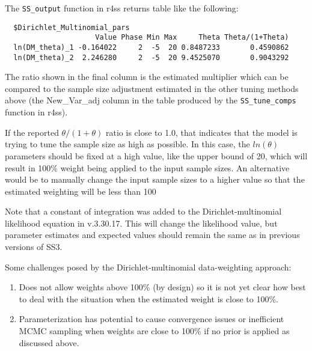 The \texttt{SS\_output} function in r4ss returns table like the following:
\begin{small}
\begin{verbatim}
  $Dirichlet_Multinomial_pars
                     Value Phase Min Max     Theta Theta/(1+Theta)
  ln(DM_theta)_1 -0.164022     2  -5  20 0.8487233       0.4590862
  ln(DM_theta)_2  2.246280     2  -5  20 9.4525070       0.9043292
\end{verbatim}
\end{small}


The ratio shown in the final column is the estimated multiplier which can be compared to the sample size adjustment estimated in the other tuning methods above (the New\_Var\_adj column in the table produced by the \texttt{SS\_tune\_comps} function in r4ss).

If the reported $\theta/(1+\theta)$ ratio is close to 1.0, that indicates that the model is trying to tune the sample size as high as possible. In this case, the $ln(\theta)$ parameters should be fixed at a high value, like the upper bound of 20, which will result in 100\% weight being applied to the input sample sizes. An alternative would be to manually change the input sample sizes to a higher value so that the estimated weighting will be less than 100%

Note that a constant of integration was added to the Dirichlet-multinomial likelihood equation in v.3.30.17. This will change the likelihood value, but parameter estimates and expected values should remain the same as in previous versions of SS3.

Some challenges posed by the Dirichlet-multinomial data-weighting approach:
\begin{enumerate}
	\item Does not allow weights above 100\% (by design) so it is not yet clear how best to deal with the situation when the estimated weight is close to 100\%.
	\item Parameterization has potential to cause convergence issues or inefficient MCMC sampling when weights are close to 100\% if no prior is applied as discussed above.
\end{enumerate}

